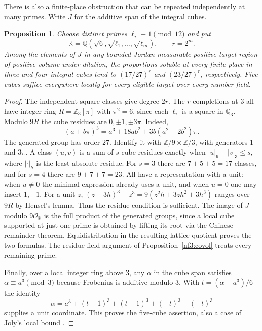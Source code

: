 \documentclass[11pt,letterpaper]{article}
\newtheorem{proposition}[proposition]{Proposition}
\theoremstyle{definition}
\numberwithin{equation}{section}
\begin{document}
There is also a finite-place obstruction that can be repeated independently
at many primes. Write $J$ for the additive span of the integral cubes.

\begin{proposition}\label{nf3:amplify}
Choose distinct primes $\ell_i\equiv1\pmod{12}$ and put
\[
\mathbb K=\mathbb Q(\sqrt6,\sqrt{\ell_1},\ldots,\sqrt{\ell_m}),\qquad r=2^m.
\] Among the elements of $J$ in any bounded Jordan-measurable
positive target region of positive volume under dilation, the proportions
soluble at every finite place in three and four integral cubes tend to
$(17/27)^r$ and $(23/27)^r$, respectively. Five cubes suffice everywhere
locally for every eligible target over every number field.
\end{proposition}
\begin{proof}
The independent square classes give degree $2r$. The $r$ completions at
$3$ all have integer ring $R=\mathbb Z_3[\pi]$ with $\pi^2=6$, since each
$\ell_i$ is a square in $\mathbb Q_3$. Modulo $9R$ the cube residues are
$0,\pm1,\pm3\pi$. Indeed,
\[
 (a+b\pi)^3=a^3+18ab^2+3b(a^2+2b^2)\pi .
\]
The generated group has order $27$. Identify it with $\mathbb Z/9\times
\mathbb Z/3$, with generators $1$ and $3\pi$. A class $(u,v)$ is a sum
of $s$ cube residues exactly when $|u|_9+|v|_3\le s$, where $|\cdot|_h$
is the least absolute residue. For $s=3$ there are $7+5+5=17$ classes,
and for $s=4$ there are $9+7+7=23$. All have a representation with a unit:
when $u\ne0$ the minimal expression already uses a unit, and when $u=0$
one may insert $1,-1$. For a unit $z$, $(z+3h)^3-z^3=9(z^2h+3zh^2+3h^3)$
ranges over $9R$ by Hensel's lemma. Thus the residue condition is sufficient.
The image of $J$ modulo $9\mathcal O_{\mathbb K}$ is the full product of
the generated groups, since a local cube supported at just one prime is obtained
by lifting its root via the Chinese remainder theorem. Equidistribution in
the resulting lattice quotient proves the two formulas. The residue-field
argument of Proposition~\ref{nf3:covol} treats every remaining prime.

Finally, over a local integer ring above $3$, any $\alpha$ in the cube span
satisfies $\alpha\equiv a^3\pmod3$ because Frobenius is additive modulo $3$.
With $t=(\alpha-a^3)/6$ the identity
\[
 \alpha=a^3+(t+1)^3+(t-1)^3+(-t)^3+(-t)^3
\]
supplies a unit coordinate. This proves the five-cube assertion, also a
case of Joly's local bound \cite{nf3:joly}.
\end{proof}
\end{document}
